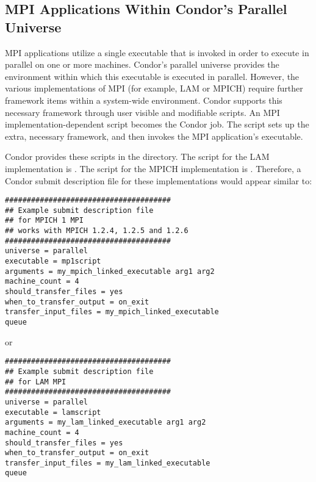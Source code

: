 \subsection{\label{sec:parallel-mpi-submit}MPI Applications Within Condor's Parallel Universe}

MPI applications utilize a single executable that is invoked in order to
execute in parallel on one or more machines. 
Condor's parallel universe provides the environment within
which this executable is executed in parallel.
However, the various implementations of MPI
(for example, LAM or MPICH) require further framework items within
a system-wide environment.
Condor supports this necessary framework through 
user visible and modifiable scripts.
An MPI implementation-dependent script becomes the Condor job.
The script sets up the extra, necessary framework,
and then invokes the MPI application's executable.

Condor provides these scripts in the
directory.
The script for the LAM implementation is .
The script for the MPICH implementation is .
Therefore, a Condor submit description file for these
implementations would appear similar to:

\begin{verbatim}
######################################
## Example submit description file
## for MPICH 1 MPI
## works with MPICH 1.2.4, 1.2.5 and 1.2.6
######################################
universe = parallel
executable = mp1script
arguments = my_mpich_linked_executable arg1 arg2
machine_count = 4
should_transfer_files = yes
when_to_transfer_output = on_exit
transfer_input_files = my_mpich_linked_executable
queue
\end{verbatim}

or

\begin{verbatim}
######################################
## Example submit description file
## for LAM MPI
######################################
universe = parallel
executable = lamscript
arguments = my_lam_linked_executable arg1 arg2
machine_count = 4
should_transfer_files = yes
when_to_transfer_output = on_exit
transfer_input_files = my_lam_linked_executable
queue
\end{verbatim}

